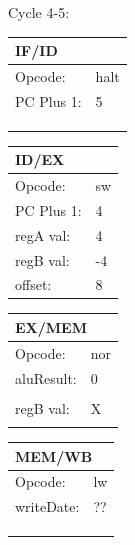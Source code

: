 \documentclass[12pt, letterpaper]{article}
\begin{document}
Cycle 4-5:
\begin{table}[H]
    \begin{tabular}{|ll|}
    \hline
    \multicolumn{2}{|l|}{IF/ID}            \\ \hline
    \multicolumn{1}{|l|}{Opcode:}    & halt \\ \hline
    \multicolumn{1}{|l|}{PC Plus 1:} & 5   \\ \hline
    \multicolumn{1}{|l|}{}           &     \\ \hline
    \multicolumn{1}{|l|}{}           &     \\ \hline
    \multicolumn{1}{|l|}{}           &     \\ \hline
    \end{tabular}
    \begin{tabular}{|ll|}
    \hline
    \multicolumn{2}{|l|}{ID/EX}             \\ \hline
    \multicolumn{1}{|l|}{Opcode:}    & sw \\ \hline
    \multicolumn{1}{|l|}{PC Plus 1:} & 4    \\ \hline
    \multicolumn{1}{|l|}{regA val:}  & 4    \\ \hline
    \multicolumn{1}{|l|}{regB val:}  & -4    \\ \hline
    \multicolumn{1}{|l|}{offset:}    & 8    \\ \hline
    \end{tabular}
    \begin{tabular}{|ll|}
    \hline
    \multicolumn{2}{|l|}{EX/MEM}            \\ \hline
    \multicolumn{1}{|l|}{Opcode:}    & nor \\ \hline
    \multicolumn{1}{|l|}{aluResult:} & 0    \\ \hline
    \multicolumn{1}{|l|}{}           &      \\ \hline
    \multicolumn{1}{|l|}{regB val:}  & X    \\ \hline
    \multicolumn{1}{|l|}{}           &      \\ \hline
    \end{tabular}
    \begin{tabular}{|ll|}
    \hline
    \multicolumn{2}{|l|}{MEM/WB}            \\ \hline
    \multicolumn{1}{|l|}{Opcode:}    & lw \\ \hline
    \multicolumn{1}{|l|}{writeDate:} & ??    \\ \hline
    \multicolumn{1}{|l|}{}           &      \\ \hline
    \multicolumn{1}{|l|}{}           &      \\ \hline
    \multicolumn{1}{|l|}{}           &      \\ \hline
    \end{tabular}
\end{table}
\end{document}
